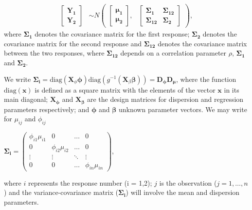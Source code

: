 \documentclass[useAMS,referee]{biom}
\begin{document}
\begin{align}\label{eq1}
\begin{bmatrix}\mathbf{Y_1}\\
\mathbf{Y_2}
\end{bmatrix} &\sim  N
\begin{pmatrix}
\begin{bmatrix}
\boldsymbol{\mu_1}\\
\boldsymbol{\mu_2}
\end{bmatrix}\!\!,&
\begin{bmatrix}
\boldsymbol{\Sigma_1} & \boldsymbol{\Sigma_{12}} \\
\boldsymbol{\Sigma_{12}} & \boldsymbol{\Sigma_2}
\end{bmatrix}
\end{pmatrix},
\end{align}
where  $\boldsymbol{\Sigma_1}$ denotes the covariance matrix for the first response; $\boldsymbol{\Sigma_2}$ denotes the covariance matrix for the second response and $\boldsymbol{\Sigma_{12}}$
denotes the covariance matrix between the two responses, where $\boldsymbol{\Sigma_{12}}$ depends on a correlation parameter $\rho$, $\boldsymbol{\Sigma_1}$ and $\boldsymbol{\Sigma_2}$.

We write  $\boldsymbol{\Sigma_i} = \mbox{diag}(\mathbf{X}_\phi \boldsymbol{\phi}) \mbox{diag} (g^{-1}(\mathbf{X}_\beta \boldsymbol{\beta}))  = \mathbf{D_\phi}\mathbf{D_\mu}$, where the function $\mbox{diag}(\mathbf{x})$ is defined as a square matrix with the elements of the vector $\mathbf{x}$ in its main diagonal; $\mathbf{X_\phi}$ and $\mathbf{X_\beta}$ are the design  matrices for dispersion and regression parameters respectively; and $\boldsymbol\phi$ and $\boldsymbol\beta$ unknown parameter vectors. We may write for $\mu_{ij}$ and $\phi_{ij}$
\begin{center}
	$\boldsymbol{\Sigma_i} =
	\begin{pmatrix}
	\phi_{i1}\mu_{i1} & 0 & \dots & 0 \\
	0 & \phi_{i2}\mu_{i2} & \dots & 0 \\
	\vdots & \vdots & \ddots & \vdots \\
	0 & 0 & \dots & \phi_{in}\mu_{in}
	\end{pmatrix}
	$,
\end{center}
where $i$ represents the response number (i = 1,2); $j$ is the observation ($j = 1, \dots, n$) and the variance-covariance matrix ($\boldsymbol{\Sigma_i}$) will involve the mean and dispersion parameters.
\end{document}
